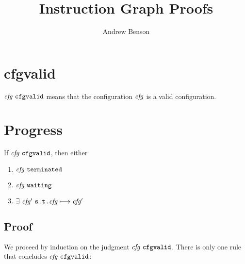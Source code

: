 \documentclass[12pt]{article}
\title{Instruction Graph Proofs}
\author{Andrew Benson}
\date{}
\begin{document}
\maketitle

\thispagestyle{simple}

\section{cfgvalid}

$\cfgvalid{\nterm{cfg}}$ means that the configuration $\nterm{cfg}$ is a valid
configuration.

\begin{mathpar}
\end{mathpar}

\section{Progress}

If $\cfgvalid{\nterm{cfg}}$, then either
\begin{enumerate}
  \item $\terminated{\nterm{cfg}}$
  \item $\waiting{\nterm{cfg}}$
  \item $\exists\ \nterm{cfg'}\ \texttt{s.t.} \steps{\nterm{cfg}}{\nterm{cfg'}}$
\end{enumerate}

\subsection{Proof}

We proceed by induction on the judgment $\cfgvalid{\nterm{cfg}}$. There is only
one rule that concludes $\cfgvalid{\nterm{cfg}}$:

\begin{mathpar}
\end{mathpar}
\end{document}
